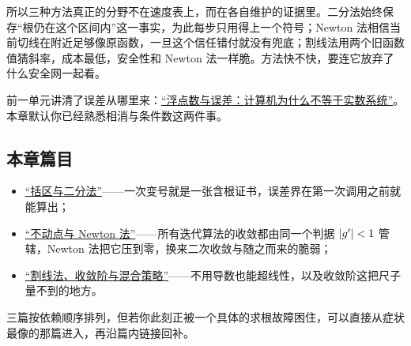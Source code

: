 所以三种方法真正的分野不在速度表上，而在各自维护的证据里。二分法始终保存``根仍在这个区间内''这一事实，为此每步只用得上一个符号；Newton 法相信当前切线在附近足够像原函数，一旦这个信任错付就没有兜底；割线法用两个旧函数值猜斜率，成本最低，安全性和 Newton 法一样脆。方法快不快，要连它放弃了什么安全网一起看。

前一单元讲清了误差从哪里来：\hyperref[ch:061]{``浮点数与误差：计算机为什么不等于实数系统''}。本章默认你已经熟悉相消与条件数这两件事。

\subsection{本章篇目}

\begin{itemize}
\tightlist
\item \hyperref[sec:08-Numerical-Analysis/02-Root-Finding/01]{``括区与二分法''}——一次变号就是一张含根证书，误差界在第一次调用之前就能算出；
\item \hyperref[sec:08-Numerical-Analysis/02-Root-Finding/02]{``不动点与 Newton 法''}——所有迭代算法的收敛都由同一个判据 \(\left|g'\right|<1\) 管辖，Newton 法把它压到零，换来二次收敛与随之而来的脆弱；
\item \hyperref[sec:08-Numerical-Analysis/02-Root-Finding/03]{``割线法、收敛阶与混合策略''}——不用导数也能超线性，以及收敛阶这把尺子量不到的地方。
\end{itemize}

三篇按依赖顺序排列，但若你此刻正被一个具体的求根故障困住，可以直接从症状最像的那篇进入，再沿篇内链接回补。
